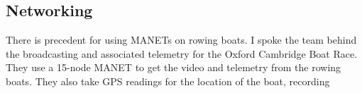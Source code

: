 \documentclass[12pt,a4paper]{report}
\begin{document}
\subsection{Networking}
There is precedent for using MANETs on rowing boats. I spoke the team behind the broadcasting and associated telemetry for the Oxford Cambridge Boat Race. They use a 15-node MANET to get the video and telemetry from the rowing boats. They also take GPS readings for the location of the boat, recording
\end{document}
